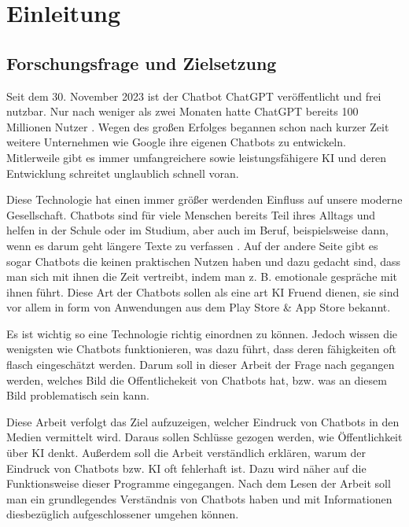 \section{Einleitung}
	\subsection{Forschungsfrage und Zielsetzung}
	Seit dem 30. November 2023 ist der Chatbot ChatGPT veröffentlicht und frei nutzbar. 
	Nur nach weniger als zwei Monaten hatte ChatGPT bereits 100 Millionen Nutzer \cite[S. 15]{spitzer23}.
	Wegen des großen Erfolges begannen schon nach kurzer Zeit weitere Unternehmen wie Google ihre eigenen 
	Chatbots zu entwickeln. Mitlerweile gibt es immer umfangreichere sowie leistungsfähigere KI und
	deren Entwicklung schreitet unglaublich schnell voran.
	
	Diese Technologie hat einen immer größer werdenden Einfluss auf unsere moderne Gesellschaft. 
	Chatbots sind für viele Menschen bereits Teil ihres Alltags und helfen in der Schule oder
	im Studium, aber auch im Beruf, beispielsweise dann, wenn es darum geht längere Texte zu verfassen \cite[S. 175, S. 185]{shaji23}.
	Auf der andere Seite gibt es sogar Chatbots die keinen praktischen Nutzen haben und dazu gedacht
	sind, dass man sich mit ihnen die Zeit vertreibt, indem man z. B. emotionale gespräche mit ihnen 
	führt. Diese Art der Chatbots sollen als eine art KI Fruend dienen, sie sind vor allem in form
	von Anwendungen aus dem Play Store \& App Store bekannt.
	
	Es ist wichtig so eine Technologie richtig einordnen zu können. Jedoch wissen die wenigsten
	wie Chatbots funktionieren, was dazu führt, dass deren fähigkeiten oft flasch eingeschätzt werden. 
	Darum soll in dieser Arbeit der Frage nach gegangen werden, welches Bild die Offentlichekeit von 
	Chatbots hat, bzw. was an diesem Bild problematisch sein kann. 

	Diese Arbeit verfolgt das Ziel aufzuzeigen, welcher Eindruck von Chatbots in den Medien   
	vermittelt wird. Daraus sollen Schlüsse gezogen werden, wie Öffentlichkeit über KI denkt.  
	Außerdem soll die Arbeit verständlich erklären, warum der Eindruck von Chatbots bzw. KI oft 
	fehlerhaft ist. Dazu wird näher auf die Funktionsweise dieser Programme eingegangen. Nach 
	dem Lesen der Arbeit soll man ein grundlegendes Verständnis von Chatbots haben und mit 
	Informationen diesbezüglich aufgeschlossener umgehen können. 

	\clearpage
